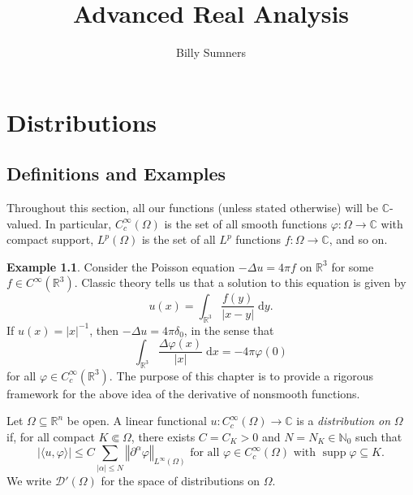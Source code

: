\documentclass{book}
\title{Advanced Real Analysis}
\author{Billy Sumners}
\newcommand{\scrD}{\mathscr{D}}
\newcommand{\bbC}{\mathbb{C}}
\newcommand{\bbN}{\mathbb{N}}
\newcommand{\bbR}{\mathbb{R}}
\renewcommand{\d}{\mathrm{d}}
\renewcommand{\phi}{\varphi}
\newcommand{\abs}[1]{\left\lvert {#1} \right\rvert}
\newcommand{\norm}[1]{\left\Vert {#1} \right\Vert}
\DeclareMathOperator{\supp}{supp}
\theoremstyle{definition}
\newtheorem{example}[theorem]{Example}
\theoremstyle{remark}
\numberwithin{equation}{chapter}
\begin{document}
\maketitle 

\tableofcontents

\chapter{Distributions}
\section{Definitions and Examples}

Throughout this section, all our functions (unless stated otherwise) will be $\bbC$-valued. In particular, $C_c^\infty(\Omega)$ is the set of all smooth functions $\phi \colon \Omega \to \bbC$ with compact support, $L^p(\Omega)$ is the set of all $L^p$ functions $f \colon \Omega \to \bbC$, and so on.
\begin{example}
    Consider the Poisson equation $- \Delta u = 4\pi f$ on $\bbR^3$ for some $f \in C^\infty(\bbR^3)$. Classic theory tells us that a solution to this equation is given by 
    \begin{equation}
        u(x) = \int_{\bbR^3} \frac{f(y)}{\abs{x-y}} \; \d y.
    \end{equation}
    If $u(x) = \abs{x}^{-1}$, then $-\Delta u = 4\pi \delta_0$, in the sense that
    \begin{equation}
        \int_{\bbR^3} \frac{\Delta \phi(x)}{\abs{x}} \; \d x = - 4\pi \phi(0)
    \end{equation}
    for all $\phi \in C^\infty_c(\bbR^3)$. The purpose of this chapter is to provide a rigorous framework for the above idea of the derivative of nonsmooth functions.
\end{example}
Let $\Omega \subseteq \bbR^n$ be open. A linear functional $u \colon C_c^\infty(\Omega) \to \bbC$ is a \textit{distribution on} $\Omega$ if, for all compact $K \Subset \Omega$, there exists $C = C_K > 0$ and $N = N_K \in \bbN_0$ such that 
\begin{equation} \label{eq:definitionOfDistribution}
    \abs{\langle u, \phi \rangle} \leq C \sum_{\abs{\alpha} \leq N} \norm{\partial^{\alpha}\phi}_{L^\infty(\Omega)} 
    \text{ for all } \phi \in C_c^\infty(\Omega) \text{ with } \supp{\phi} \subseteq K.
\end{equation}
We write $\scrD'(\Omega)$ for the space of distributions on $\Omega$.
\end{document}
